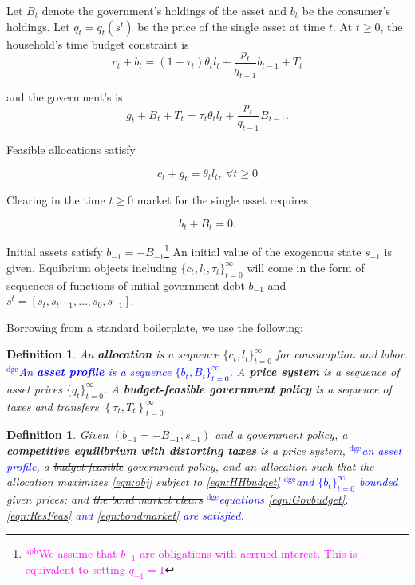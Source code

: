 \documentclass[12pt]{article}
\newcommand{\dge}[1]{\textcolor{blue}{$^{\textrm{dge}}${#1}}}
\newcommand{\apb}[1]{\textcolor{magenta}{$^{\textrm{apb}}${#1}}}
\newtheorem{definition}[theorem]{Definition}
\begin{document}
Let $B_t$ denote the government's holdings of the asset and $b_t$ be the consumer's holdings.
Let $q_t= q_t(s^t)$ be the price of the single  asset at time $t$.
 At $t \geq 0$, the household's time budget constraint is
 \begin{equation}
 \label{eqn:HHbudget}
 c_{t}+b_{t}=\left( 1-\tau _{t}\right) \theta _{t}l_{t}+\frac{p_{t}}{q_{t-1}}b_{t-1}+T_{t}
 \end{equation}

 and the government's is
 \begin{equation}
 \label{eqn:Govbudget}
g_{t}+B_{t}+T_t=\tau _{t}\theta_{t}l_{t}+\frac{p_{t}}{q_{t-1}}B_{t-1}.
 \end{equation}


Feasible allocations satisfy

\begin{equation}
 \label{eqn:ResFeas}
 c_{t}+g_t = \theta _{t} l_{t}, \ \forall t \geq 0
 \end{equation}

 Clearing in the time $t \geq 0$ market for the single asset requires

 
\begin{equation}
 \label{eqn:bondmarket}
 b_{t}+B_{t}=0.
 \end{equation}

 Initial assets satisfy $b_{-1}=-B_{-1}$\footnote{\apb{We assume that $b_{-1}$ are obligations with acrrued interest. This is equivalent to setting $q_{-1}=1$}} An initial value of the exogenous state  $s_{-1}$ is given.
Equibrium objects including $\{c_t, l_t, \tau_t\}_{t=0}^\infty$ will come in the form of sequences of functions of  initial government debt  $b_{-1}$ and  $s^t = [s_t, s_{t-1}, \ldots, s_0, s_{-1}]$.


Borrowing from a standard boilerplate, we use the following:

\begin{definition}
An \textbf{allocation} is a sequence $\{c_t,l_t\}_{t=0}^\infty$ for consumption and labor. \dge{An \textbf{asset profile}  is a sequence $\{b_t,B_t\}_{t=0}^\infty$}. A \textbf{price system} is a sequence of asset prices $\{q_t\}_{t=0}^\infty$.  A \textbf{budget-feasible government policy} is a sequence of taxes and transfers $\left\{ \tau _{t},T_{t}\right\} _{t=0}^{\infty }$
\end{definition}

\begin{definition}
Given  $\left(b_{-1}=-B_{-1},s_{-1}\right) $ and a government policy,  a \textbf{competitive equilibrium
with distorting taxes} is a price system, \dge{an asset profile}, a \st{budget-feasible} government policy, and an allocation such that
the allocation maximizes \eqref{eqn:obj} subject to \eqref{eqn:HHbudget} \dge{and $\{b_{t}\}_{t=0}^\infty$ bounded}  given prices; and \st{the bond  market clears} \dge{equations \eqref{eqn:Govbudget}, \eqref{eqn:ResFeas} and \eqref{eqn:bondmarket} are satisfied}.
\end{definition}
\end{document}
